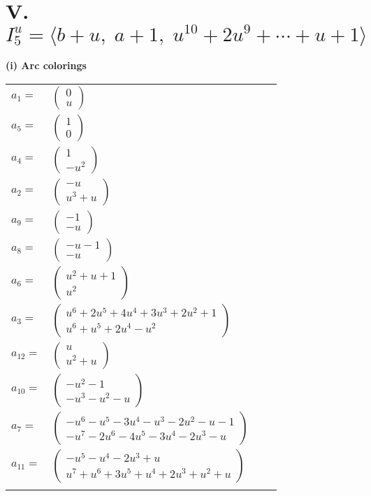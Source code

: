 \documentclass[1p]{elsarticle_modified}
\theoremstyle{definition}
\begin{document}
\centering \section*{V. $I^u_{5}= \langle b+u,\;a+1,\;u^{10}+2 u^9+\cdots+u+1 \rangle$}
\flushleft \textbf{(i) Arc colorings}\\
\begin{tabular}{m{7pt} m{180pt} m{7pt} m{180pt} }
\flushright $a_{1}=$&$\begin{pmatrix}0\\u\end{pmatrix}$ \\
\flushright $a_{5}=$&$\begin{pmatrix}1\\0\end{pmatrix}$ \\
\flushright $a_{4}=$&$\begin{pmatrix}1\\- u^2\end{pmatrix}$ \\
\flushright $a_{2}=$&$\begin{pmatrix}- u\\u^3+u\end{pmatrix}$ \\
\flushright $a_{9}=$&$\begin{pmatrix}-1\\- u\end{pmatrix}$ \\
\flushright $a_{8}=$&$\begin{pmatrix}- u-1\\- u\end{pmatrix}$ \\
\flushright $a_{6}=$&$\begin{pmatrix}u^2+u+1\\u^2\end{pmatrix}$ \\
\flushright $a_{3}=$&$\begin{pmatrix}u^6+2 u^5+4 u^4+3 u^3+2 u^2+1\\u^6+u^5+2 u^4- u^2\end{pmatrix}$ \\
\flushright $a_{12}=$&$\begin{pmatrix}u\\u^2+u\end{pmatrix}$ \\
\flushright $a_{10}=$&$\begin{pmatrix}- u^2-1\\- u^3- u^2- u\end{pmatrix}$ \\
\flushright $a_{7}=$&$\begin{pmatrix}- u^6- u^5-3 u^4- u^3-2 u^2- u-1\\- u^7-2 u^6-4 u^5-3 u^4-2 u^3- u\end{pmatrix}$ \\
\flushright $a_{11}=$&$\begin{pmatrix}- u^5- u^4-2 u^3+u\\u^7+u^6+3 u^5+u^4+2 u^3+u^2+u\end{pmatrix}$\\&\end{tabular}
\end{document}
